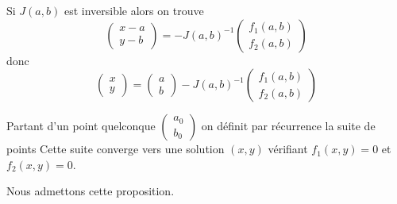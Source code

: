 \documentclass[class=report,crop=false]{standalone}
\begin{document}
Si $J(a,b)$ est inversible alors on trouve
$$ \begin{pmatrix}x-a\\y-b\end{pmatrix} = -J(a,b)^{-1}\begin{pmatrix}f_1(a,b)\\f_2(a,b)\end{pmatrix}$$
donc 
$$\begin{pmatrix}x\\y\end{pmatrix} = \begin{pmatrix}a\\b\end{pmatrix}-J(a,b)^{-1}\begin{pmatrix}f_1(a,b)\\f_2(a,b)\end{pmatrix}$$

\begin{proposition}
Partant d'un point quelconque 
$\left(\begin{smallmatrix}a_0\\b_0\end{smallmatrix}\right)$ on définit par récurrence la suite de points 
Cette suite converge vers une solution $(x,y)$ vérifiant $f_1(x,y)=0$ et $f_2(x,y)=0$.
\end{proposition}

Nous admettons cette proposition.
\end{document}
